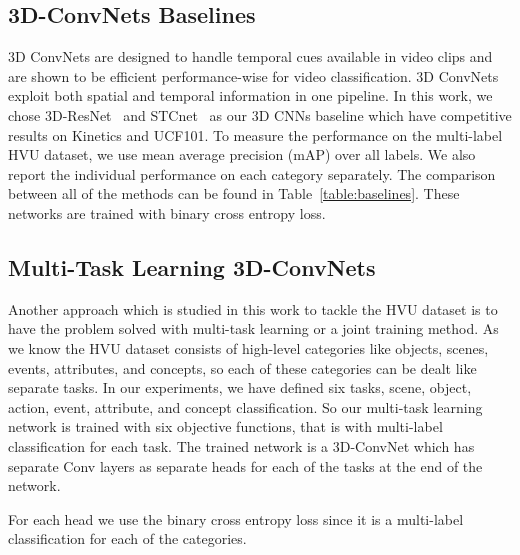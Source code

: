 \documentclass[runningheads]{llncs}
\begin{document}
\subsection{3D-ConvNets Baselines}
3D ConvNets are designed to handle temporal cues available in video clips and are shown to be efficient performance-wise for video classification. 3D ConvNets exploit both spatial and temporal information in one pipeline. In this work, we chose 3D-ResNet~\cite{res3d} and STCnet~\cite{stcnn} as our 3D CNNs baseline which have competitive results on Kinetics and UCF101. To measure the performance on the multi-label HVU dataset, we use mean average precision (mAP) over all labels. We also report the individual performance on each category 
separately. The comparison between all of the methods can be found in {Table~\ref{table:baselines}}. These networks are trained with binary cross entropy loss.



\subsection{Multi-Task Learning 3D-ConvNets} \label{subsec:multi_task_learning}
Another approach which is studied in this work to tackle the HVU dataset is to have the problem solved with multi-task learning or a joint training method. As we know the HVU dataset consists of high-level categories like objects, scenes, events, attributes, and concepts, so each of these categories can be dealt like separate tasks.
In our experiments, we have defined six tasks, scene, object, action, event, attribute, and concept classification. So our multi-task learning network is trained with six objective functions, that is with multi-label classification for each task. The trained network is a 3D-ConvNet which has separate Conv layers as separate heads for each of the tasks at the end of the network.


For each head we use the binary cross entropy loss since it is a multi-label classification for each of the categories.
\end{document}
